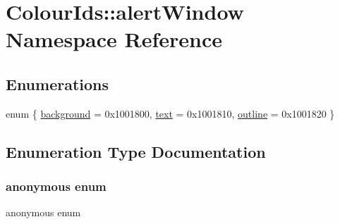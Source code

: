 \hypertarget{namespaceColourIds_1_1alertWindow}{}\section{Colour\+Ids\+:\+:alert\+Window Namespace Reference}
\label{namespaceColourIds_1_1alertWindow}
\subsection*{Enumerations}
\begin{DoxyCompactItemize}
\item 
enum \{ \mbox{\hyperlink{namespaceColourIds_1_1alertWindow_a4b3c283c820544d1c52b900661c7b2b1a2a0d40f85d986704acb3c89094eeaa7e}{background}} = 0x1001800, 
\mbox{\hyperlink{namespaceColourIds_1_1alertWindow_a4b3c283c820544d1c52b900661c7b2b1a847ef49464e079722919f526f71419f5}{text}} = 0x1001810, 
\mbox{\hyperlink{namespaceColourIds_1_1alertWindow_a4b3c283c820544d1c52b900661c7b2b1a05e137e5d10ae22ffa1033c354b5042e}{outline}} = 0x1001820
 \}
\end{DoxyCompactItemize}


\subsection{Enumeration Type Documentation}
\mbox{\label{namespaceColourIds_1_1alertWindow_a4b3c283c820544d1c52b900661c7b2b1}} 
\subsubsection{\texorpdfstring{anonymous enum}{anonymous enum}}
{\footnotesize\ttfamily anonymous enum}

